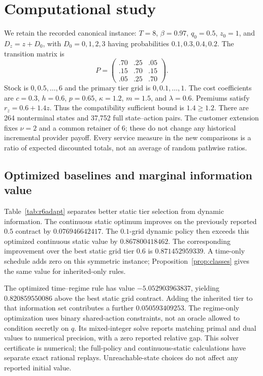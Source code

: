 \section{Computational study}\label{sec:study}
We retain the recorded canonical instance: $T=8$, $\beta=0.97$, $q_0=0.5$, $z_0=1$, and $D_z=z+D_0$, with $D_0=0,1,2,3$ having probabilities $0.1,0.3,0.4,0.2$. The transition matrix is
\[
 P=\begin{pmatrix}.70&.25&.05\\.15&.70&.15\\.05&.25&.70\end{pmatrix}.
\]
Stock is $0,0.5,\ldots,6$ and the primary tier grid is $0,0.1,\ldots,1$. The cost coefficients are $c=0.3$, $h=0.6$, $p=0.65$, $\kappa=1.2$, $m=1.5$, and $\lambda=0.6$. Premiums satisfy $r_z=0.6+1.4z$. Thus the compatibility sufficient bound is $1.4\geq1.2$. There are 264 nonterminal states and 37,752 full state--action pairs. The customer extension fixes $\nu=2$ and a common retainer of 6; these do not change any historical incremental provider payoff. Every service measure in the new comparisons is a ratio of expected discounted totals, not an average of random pathwise ratios.

\subsection{Optimized baselines and marginal information value}
Table~\ref{tab:r6adapt} separates better static tier selection from dynamic information. The continuous static optimum improves on the previously reported $0.5$ contract by $0.076946642417$. The $0.1$-grid dynamic policy then exceeds this optimized continuous static value by $0.867800418462$. The corresponding improvement over the best static grid tier $0.6$ is $0.871452959339$. A time-only schedule adds zero on this symmetric instance; Proposition~\ref{prop:classes} gives the same value for inherited-only rules.

The optimized time--regime rule has value $-5.052903963837$, yielding $0.820859550086$ above the best static grid contract. Adding the inherited tier to that information set contributes a further $0.050593409253$. The regime-only optimization uses binary shared-action constraints, not an oracle allowed to condition secretly on $q$. Its mixed-integer solve reports matching primal and dual values to numerical precision, with a zero reported relative gap. This solver certificate is numerical; the full-policy and continuous-static calculations have separate exact rational replays. Unreachable-state choices do not affect any reported initial value.


